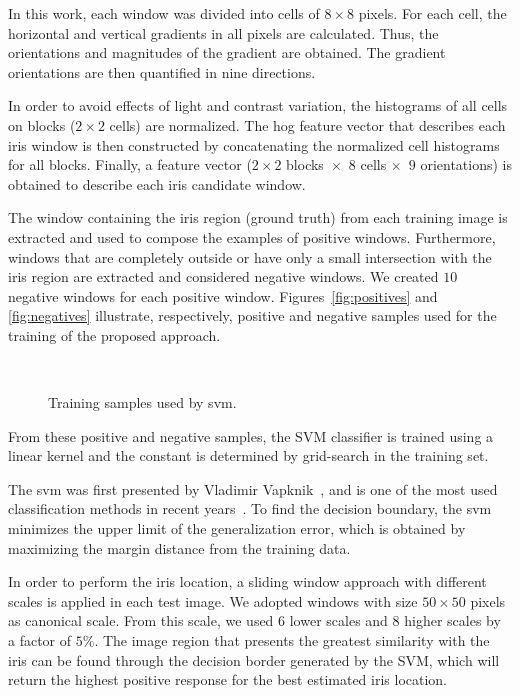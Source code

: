 \documentclass[conference]{IEEEtran}
\begin{document}
In this work, each window was divided into cells of $8\times8$ pixels. For each cell, the horizontal and vertical gradients in all pixels are calculated. Thus, the orientations and magnitudes of the gradient are obtained. The gradient orientations are then quantified in nine directions.

In order to avoid effects of light and contrast variation, the histograms of all cells on blocks ($2\times2$ cells) are normalized. The \gls*{hog} feature vector that describes each iris window is then constructed by concatenating the normalized cell histograms for all blocks. Finally, a feature vector ($2\times2$ blocks~$\times$~$8$ cells $\times$~$9$ orientations) is obtained to describe each iris candidate window.

The window containing the iris region (ground truth) from each training image is extracted and used to compose the examples of positive windows.
Furthermore, windows that are completely outside or have only a small intersection with the iris region are extracted and considered negative windows. We created $10$ negative windows for each positive window.
Figures~\ref{fig:positives} and \ref{fig:negatives} illustrate, respectively, positive and negative samples used for the training of the proposed approach.

\begin{figure}[!htb]
 \\[-1ex]

\caption{Training samples used by \gls*{svm}.}
\end{figure}

From these positive and negative samples, the SVM classifier is trained using a linear kernel and the constant is determined by grid-search in the training set.

The \gls*{svm} was first presented by Vladimir Vapknik~\cite{boser1992training}, and is one of the most used classification methods in recent years~\cite{franchi2016hyperspectral,ruiz2014bayesian}. 
To find the decision boundary, the \gls*{svm} minimizes the upper limit of the generalization error, which is obtained by maximizing the margin distance from the training data.

In order to perform the iris location, a sliding window approach with different scales is applied in each test image.
We adopted windows with size $50\times50$ pixels as canonical scale. From this scale, we used $6$ lower scales and $8$ higher scales by a factor of $5\%$.
The image region that presents the greatest similarity with the iris can be found through the decision border generated by the SVM, which will return the highest positive response for the best estimated iris location.
\end{document}
